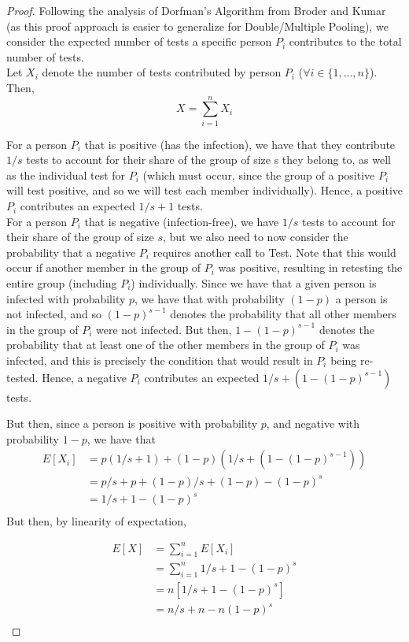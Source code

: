 \documentclass[12pt]{article}
\begin{document}
\begin{proof}

Following the analysis of Dorfman's Algorithm from Broder and Kumar (as this proof approach is easier to generalize for Double/Multiple Pooling), we consider the expected number of tests a specific person $P_i$ contributes to the total number of tests. \\

Let $X_i$ denote the number of tests contributed by person $P_i$ ($\forall i \in \{1,...,n\}$). Then, $$X=\sum\limits_{i=1}^{n}X_i$$

For a person $P_i$ that is positive (has the infection), we have that they contribute $1/s$ tests to account for their share of the group of size s they belong to, as well as the individual test for $P_i$ (which must occur, since the group of a positive $P_i$ will test positive, and so we will test each member individually). Hence, a positive $P_i$ contributes an expected $1/s + 1$ tests. \\

For a person $P_i$ that is negative (infection-free), we have $1/s$ tests to account for their share of the group of size $s$, but we also need to now consider the probability that a negative $P_i$ requires another call to {\sf Test}. Note that this would occur if another member in the group of $P_i$ was positive, resulting in retesting the entire group (including $P_i$) individually. Since we have that a given person is infected with probability $p$, we have that with probability $(1-p)$ a person is not infected, and so $(1-p)^{s-1}$ denotes the probability that all other members in the group of $P_i$ were not infected. But then, $1- (1-p)^{s-1}$ denotes the probability that at least one of the other members in the group of $P_i$ was infected, and this is precisely the condition that would result in $P_i$ being re-tested. Hence, a negative $P_i$ contributes an expected $1/s+(1-(1-p)^{s-1})$ tests. 

But then, since a person is positive with probability $p$, and negative with probability $1-p$, we have that
\begin{align*}
E[X_i]&=p(1/s+1)+(1-p)(1/s+(1-(1-p)^{s-1})) \\
        &=p/s+p+(1-p)/s+(1-p)-(1-p)^{s} \\
        &=1/s+1-(1-p)^{s} \\
\end{align*}    
But then, by linearity of expectation,


\begin{align*}
E[X]&=\sum\limits_{i=1}^{n}E[X_i] \\
      &= \sum\limits_{i=1}^{n}{1/s+1-(1-p)^{s}} \\ 
      &= n[1/s+1-(1-p)^{s}] \\
      &= n/s+n-n(1-p)^{s} \\
\end{align*}      




\end{proof}
\end{document}
